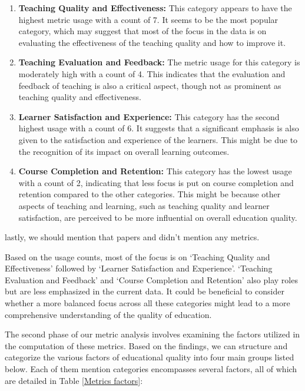 \documentclass{svproc}
\begin{document}
\begin{enumerate}
\item \textbf{Teaching Quality and Effectiveness:} This category appears to have the highest metric usage with a count of 7. It seems to be the most popular category, which may suggest that most of the focus in the data is on evaluating the effectiveness of the teaching quality and how to improve it.
\item \textbf{Teaching Evaluation and Feedback:} The metric usage for this category is moderately high with a count of 4. This indicates that the evaluation and feedback of teaching is also a critical aspect, though not as prominent as teaching quality and effectiveness.
\item \textbf{Learner Satisfaction and Experience:} This category has the second highest usage with a count of 6. It suggests that a significant emphasis is also given to the satisfaction and experience of the learners. This might be due to the recognition of its impact on overall learning outcomes.
\item \textbf{Course Completion and Retention:} This category has the lowest usage with a count of 2, indicating that less focus is put on course completion and retention compared to the other categories. This might be because other aspects of teaching and learning, such as teaching quality and learner satisfaction, are perceived to be more influential on overall education quality.
\end{enumerate}

lastly, we should mention that papers\cite{Evaluation_Model_of_PE_Teaching_Quality_Based_on_Active_Learning_Support_Vector_Machine} and \cite{Sentiment_analysis_of_student_feedback_using_machine_learning_and_lexicon-based_approaches} didn't mention any metrics.

Based on the usage counts, most of the focus is on `Teaching Quality and Effectiveness' followed by `Learner Satisfaction and Experience'. `Teaching Evaluation and Feedback' and `Course Completion and Retention' also play roles but are less emphasized in the current data. It could be beneficial to consider whether a more balanced focus across all these categories might lead to a more comprehensive understanding of the quality of education.

The second phase of our metric analysis involves examining the factors utilized in the computation of these metrics. Based on the findings, we can structure and categorize the various factors of educational quality into four main groups listed below. Each of them mention categories encompasses several factors, all of which are detailed in Table \ref{Metrics factors}:
\end{document}
